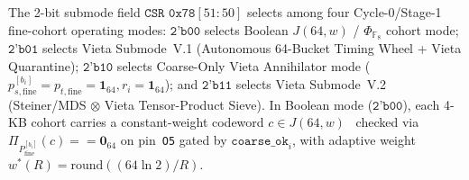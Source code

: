 \documentclass[11pt,letterpaper]{article}
\theoremstyle{spectralthm}
\begin{document}
The 2-bit submode field $\texttt{CSR~0x78}[51:50]$ selects among four Cycle-0/Stage-1 fine-cohort operating modes: $\texttt{2'b00}$ selects Boolean $J(64,w)$ / $\Phi_{\mathbb{F}_8}$ cohort mode; $\texttt{2'b01}$ selects Vieta Submode~V.1 (Autonomous 64-Bucket Timing Wheel + Vieta Quarantine); $\texttt{2'b10}$ selects Coarse-Only Vieta Annihilator mode ($p_{s,\mathrm{fine}}^{[b_i]} = p_{t,\mathrm{fine}} = \mathbf{1}_{64}, r_i = \mathbf{1}_{64}$); and $\texttt{2'b11}$ selects Vieta Submode~V.2 (Steiner/MDS $\otimes$ Vieta Tensor-Product Sieve). In Boolean mode ($\texttt{2'b00}$), each 4-KB cohort carries a constant-weight codeword $c \in J(64,w)$~\cite{macwilliams1977theorytheorytheorytheorytheorytheorytheorytheorytheorytheorytheorytheorytheorytheorytheorytheory} checked via $\Pi_{P_{\mathrm{fine}}^{[b_i]}}(c) == \mathbf{0}_{64}$ on pin~\texttt{O5} gated by $\texttt{coarse\_ok}_i$, with adaptive weight $w^*(R) = \mathrm{round}((64 \ln 2)/R)$.
\end{document}
